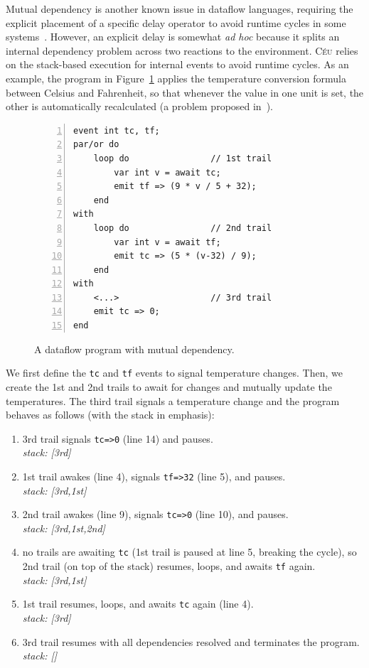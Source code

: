 \documentclass{acm_proc_article-sp}
\newcommand{\CEU}{\textsc{C\'{e}u}\xspace}
\newcommand{\code}[1] {{\small{\texttt{#1}}}}
\newcommand{\1}{\;}
\newcommand{\2}{\;\;}
\newcommand{\3}{\;\;\;}
\newcommand{\5}{\;\;\;\;\;}
\begin{document}
Mutual dependency is another known issue in dataflow languages, requiring the 
explicit placement of a specific delay operator to avoid runtime
cycles in some systems~\cite{frtime.embedding,luagravity.sblp}.
%
However, an explicit delay is somewhat \emph{ad hoc} because it splits an 
internal dependency problem across two reactions to the environment.
%
\CEU relies on the stack-based execution for internal events to avoid runtime 
cycles.
%
As an example, the program in Figure~\ref{lst.frp2} applies the temperature 
conversion formula between Celsius and Fahrenheit, so that whenever the value 
in one unit is set, the other is automatically recalculated (a problem proposed 
in~\cite{frp.survey}).
%
\begin{figure}[t]
\begin{lstlisting}[numbers=left,xleftmargin=2em]
event int tc, tf;
par/or do
    loop do                // 1st trail
        var int v = await tc;
        emit tf => (9 * v / 5 + 32);
    end
with
    loop do                // 2nd trail
        var int v = await tf;
        emit tc => (5 * (v-32) / 9);
    end
with
    <...>                  // 3rd trail
    emit tc => 0;
end
\end{lstlisting}
\caption{ A dataflow program with mutual dependency.
\label{lst.frp2}
}
\end{figure}
%
We first define the \code{tc} and \code{tf} events to signal temperature 
changes.
Then, we create the 1st and 2nd trails to await for changes and mutually update 
the temperatures.
The third trail signals a temperature change and the program behaves as follows 
(with the stack in emphasis):
%
{\small
\begin{enumerate}
\setlength{\itemsep}{0pt}
\item 3rd trail signals \code{tc=>0} (line 14) and pauses.\\
    \emph{stack: [3rd]}
\item 1st trail awakes (line 4), signals \code{tf=>32} (line 5), and pauses.\\
    \emph{stack: [3rd,1st]}
\item 2nd trail awakes (line 9), signals \code{tc=>0} (line 10), and pauses.\\
    \emph{stack: [3rd,1st,2nd]}
\item no trails are awaiting \code{tc} (1st trail is paused at line 5, breaking 
    the cycle), so 2nd trail (on top of the stack) resumes, loops, and awaits 
\code{tf} again.\\
    \emph{stack: [3rd,1st]}
\item 1st trail resumes, loops, and awaits \code{tc} again (line 4).\\
    \emph{stack: [3rd]}
\item 3rd trail resumes with all dependencies resolved and terminates the 
    program.\\
    \emph{stack: []}
\end{enumerate}
}
\end{document}
